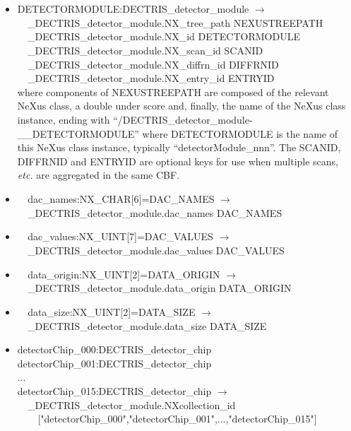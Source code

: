 \documentclass[11pt]{article}
\begin{document}
{{\begin{itemize}
\item{DETECTORMODULE:DECTRIS\_detector\_module $\rightarrow$\\
\verb|  |\_DECTRIS\_detector\_module.NX\_tree\_path    NEXUSTREEPATH \\
\verb|  |\_DECTRIS\_detector\_module.NX\_id            DETECTORMODULE\\
\verb|  |\_DECTRIS\_detector\_module.NX\_scan\_id      SCANID \\
\verb|  |\_DECTRIS\_detector\_module.NX\_diffrn\_id    DIFFRNID \\
\verb|  |\_DECTRIS\_detector\_module.NX\_entry\_id     ENTRYID \\
where components of NEXUSTREEPATH are composed of the
relevant NeXus class, a double under score and, finally, the
name of the NeXus class instance, ending with ``/DECTRIS\_detector\_module- \_\_DETECTORMODULE''
where DETECTORMODULE is the name of this NeXus class instance, typically ``detectorModule\_nnn''.
The SCANID, DIFFRNID and ENTRYID are optional keys for use
when multiple scans, {\it etc.} are aggregated in the same CBF.}

\item{\verb|  |dac\_names:NX\_CHAR[6]=DAC\_NAMES $\rightarrow$\\
\verb|  |\_DECTRIS\_detector\_module.dac\_names DAC\_NAMES}

\item{\verb|  |dac\_values:NX\_UINT[7]=DAC\_VALUES $\rightarrow$\\
\verb|  |\_DECTRIS\_detector\_module.dac\_values DAC\_VALUES}

\item{\verb|  |data\_origin:NX\_UINT[2]=DATA\_ORIGIN $\rightarrow$\\
\verb|  |\_DECTRIS\_detector\_module.data\_origin DATA\_ORIGIN}

\item{\verb|  |data\_size:NX\_UINT[2]=DATA\_SIZE $\rightarrow$\\
\verb|  |\_DECTRIS\_detector\_module.data\_size DATA\_SIZE}

\item{detectorChip\_000:DECTRIS\_detector\_chip \\
detectorChip\_001:DECTRIS\_detector\_chip \\
... \\
detectorChip\_015:DECTRIS\_detector\_chip $\rightarrow$\\
\verb|  |\_DECTRIS\_detector\_module.NXcollection\_id \\
\verb|    |["detectorChip\_000","detectorChip\_001",...,"detectorChip\_015"]}


\end{itemize}}}
\end{document}
